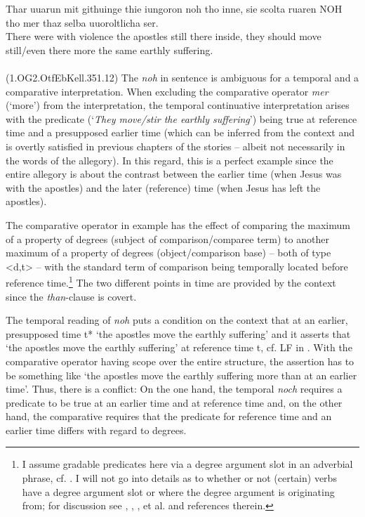 \documentclass[output=paper,
modfonts
]{langscibook}
\begin{document}
\ea\gll Thar uuarun mit githuinge thie iungoron noh tho inne, sie scolta ruaren NOH tho mer thaz selba uuoroltlicha ser.\\
       There were with violence the apostles still there inside, they should move still/even there more the same earthly suffering.\\
\label{OG2_noch_mehr_ruehren} \\ (1.OG2.OtfEbKell.351.12)
\z
The \textit{noh} in sentence  is ambiguous for a temporal and a comparative interpretation. When excluding the comparative operator \textit{mer} (`more') from the interpretation, the temporal continuative interpretation arises with the predicate (`\textit{They move/stir the earthly suffering}') being true at reference time and a presupposed earlier time (which can be inferred from the context and is overtly satisfied in previous chapters of the stories -- albeit not necessarily in the words of the allegory). In this regard, this is a perfect example since the entire allegory is about the contrast between the earlier time (when Jesus was with the apostles) and the later (reference) time (when Jesus has left the apostles). 

The comparative operator in example  has the effect of comparing the maximum of a property of degrees (subject of comparison/comparee term) to another maximum of a property of degrees (object/comparison base) -- both of type <d,t> -- with the standard term of comparison being temporally located before reference time.\footnote{ I assume gradable predicates here via a degree argument slot in an adverbial phrase, cf. . I will not go into details as to whether or not (certain) verbs have a degree argument slot or where the degree argument is originating from; for discussion see \citeauthor{pinon2008} \citeyearpar{pinon2008}, \citeauthor{rett2013} \citeyearpar{rett2013}, \citeauthor{kennedy_mcnally2005} \citeyearpar{kennedy_mcnally2005}, \citeauthor{kennedy2012} \citeyearpar{kennedy2012} et al. and references therein.} The two different points in time are provided by the context since the \textit{than}-clause is covert.

The temporal reading of \textit{noh} puts a condition on the context that at an earlier, presupposed time t* `the apostles move the earthly suffering' and it asserts that `the apostles move the earthly suffering' at reference time t, cf. LF in  \citep[cf. also][]{beck2016a_sub}. With the comparative operator having scope over the entire structure, the assertion has to be something like `the apostles move the earthly suffering more than at an earlier time'. Thus, there is a conflict: On the one hand, the temporal \textit{noch} requires a predicate to be true at an earlier time and at reference time and, on the other hand, the comparative requires that the predicate for reference time and an earlier time differs with regard to degrees.
\end{document}

